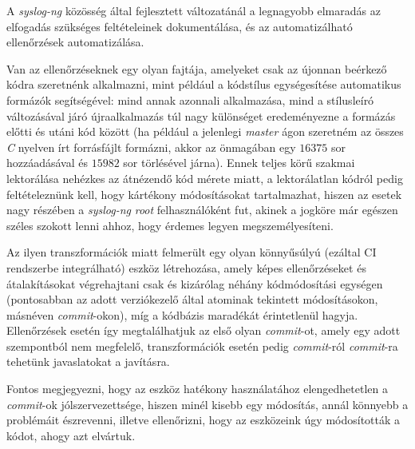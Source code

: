 A \emph{syslog-ng} közösség által fejlesztett változatánál a legnagyobb elmaradás az elfogadás
szükséges feltételeinek dokumentálása, és az automatizálható ellenőrzések automatizálása.

Van az ellenőrzéseknek egy olyan fajtája, amelyeket csak az újonnan beérkező kódra szeretnénk
alkalmazni, mint például a kódstílus egységesítése automatikus formázók segítségével:
mind annak azonnali alkalmazása, mind a stílusleíró változásával járó újraalkalmazás túl nagy
különséget eredeményezne a formázás előtti és utáni kód között (ha például a jelenlegi \emph{master}
ágon szeretném az összes \emph{C} nyelven írt forrásfájlt formázni, akkor az önmagában egy $16375$
sor hozzáadásával és $15982$ sor törlésével járna). Ennek teljes körű szakmai lektorálása
nehézkes az átnézendő kód mérete miatt, a lektorálatlan kódról pedig feltételeznünk kell, hogy
kártékony módosításokat tartalmazhat, hiszen az esetek nagy részében a \emph{syslog-ng} \emph{root}
felhasználóként fut, akinek a jogköre már egészen széles szokott lenni ahhoz, hogy érdemes legyen
megszemélyesíteni.

Az ilyen transzformációk miatt felmerült egy olyan könnyűsúlyú (ezáltal CI rendszerbe integrálható)
eszköz létrehozása, amely képes ellenőrzéseket és átalakításokat végrehajtani csak és kizárólag
néhány kódmódosítási egységen (pontosabban az adott verziókezelő által atominak tekintett
módosításokon, másnéven \emph{commit}-okon), míg a kódbázis maradékát érintetlenül hagyja.
Ellenőrzések esetén így megtalálhatjuk az első olyan \emph{commit}-ot, amely egy adott szempontból
nem megfelelő, transzformációk esetén pedig \emph{commit}-ról \emph{commit}-ra tehetünk javaslatokat
a javításra.


Fontos megjegyezni, hogy az eszköz hatékony használatához elengedhetetlen a \emph{commit}-ok
jólszervezettsége, hiszen minél kisebb egy módosítás, annál könnyebb a problémáit észrevenni,
illetve ellenőrizni, hogy az eszközeink úgy módosították a kódot, ahogy azt elvártuk.

